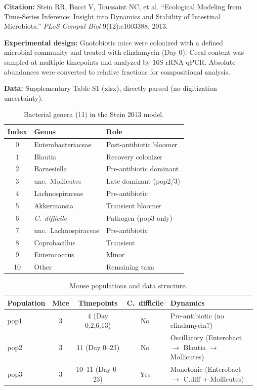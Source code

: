\documentclass[11pt,a4paper]{article}
\begin{document}
\textbf{Citation:} Stein RR, Bucci V, Toussaint NC, et al.
``Ecological Modeling from Time-Series Inference: Insight into
Dynamics and Stability of Intestinal Microbiota.''
\textit{PLoS Comput Biol} 9(12):e1003388, 2013.

\textbf{Experimental design:}
Gnotobiotic mice were colonized with a defined microbial community and
treated with clindamycin (Day 0). Cecal content was sampled at multiple
timepoints and analyzed by 16S rRNA qPCR. Absolute abundances were
converted to relative fractions for compositional analysis.

\textbf{Data:} Supplementary Table S1 (xlsx), directly parsed
(no digitization uncertainty).

\begin{table}[H]\centering\small
\caption{Bacterial genera (11) in the Stein 2013 model.}
\label{tab:species}
\begin{tabular}{cll}
\toprule
Index & Genus & Role \\
\midrule
0 & Enterobacteriaceae & Post-antibiotic bloomer \\
1 & Blautia & Recovery colonizer \\
2 & Barnesiella & Pre-antibiotic dominant \\
3 & unc.\ Mollicutes & Late dominant (pop2/3) \\
4 & Lachnospiraceae & Pre-antibiotic \\
5 & Akkermansia & Transient bloomer \\
6 & \textit{C.\ difficile} & Pathogen (pop3 only) \\
7 & unc.\ Lachnospiraceae & Pre-antibiotic \\
8 & Coprobacillus & Transient \\
9 & Enterococcus & Minor \\
10 & Other & Remaining taxa \\
\bottomrule
\end{tabular}
\end{table}

\begin{table}[H]\centering\small
\caption{Mouse populations and data structure.}
\label{tab:mice}
\begin{tabular}{lcccl}
\toprule
Population & Mice & Timepoints & C.\ difficile & Dynamics \\
\midrule
pop1 & 3 & 4 (Day 0,2,6,13) & No & Pre-antibiotic (no clindamycin?) \\
pop2 & 3 & 11 (Day 0--23) & No & Oscillatory (Enterobact $\to$ Blautia $\to$ Mollicutes) \\
pop3 & 3 & 10--11 (Day 0--23) & Yes & Monotonic (Enterobact $\to$ C.diff + Mollicutes) \\
\bottomrule
\end{tabular}
\end{table}
\end{document}
